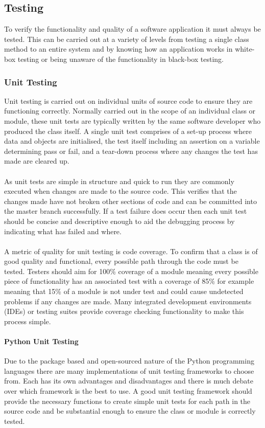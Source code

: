 \subsection{Testing}
	To verify the functionality and quality of a software application it must always be tested. This can be carried out at a variety of levels from testing a single class method to an entire system and by knowing how an application works in white-box testing or being unaware of the functionality in black-box testing.
	\subsubsection{Unit Testing}
		Unit testing is carried out on individual units of source code to ensure they are functioning correctly. Normally carried out in the scope of an individual class or module, these unit tests are typically written by the same software developer who produced the class itself. A single unit test comprises of a set-up process where data and objects are initialised, the test itself including an assertion on a variable determining pass or fail, and a tear-down process where any changes the test has made are cleared up.
		\\\\
		As unit tests are simple in structure and quick to run they are commonly executed when changes are made to the source code. This verifies that the changes made have not broken other sections of code and can be committed into the master branch successfully. If a test failure does occur then each unit test should be concise and descriptive enough to aid the debugging process by indicating what has failed and where.
		\\\\
		A metric of quality for unit testing is code coverage. To confirm that a class is of good quality and functional, every possible path through the code must be tested. Testers should aim for 100\% coverage of a module meaning every possible piece of functionality has an associated test with a coverage of 85\% for example meaning that 15\% of a module is not under test and could cause undetected problems if any changes are made. Many integrated development environments (IDEs)  or testing suites provide coverage checking functionality to make this process simple.
		\paragraph{Python Unit Testing}
			Due to the package based and open-sourced nature of the Python programming languages there are many implementations of unit testing frameworks to choose from. Each has its  own advantages and disadvantages and there is much  debate  over which framework is the best to use. A good unit testing framework should provide the necessary functions to create simple unit tests for each path in the source code and be substantial enough to ensure the class or module is correctly tested.
